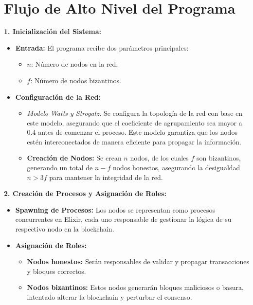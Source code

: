{\large{
    \section*{Flujo de Alto Nivel del Programa}

    \textbf{1. Inicialización del Sistema:}
    \begin{itemize}
        \item \textbf{Entrada:} El programa recibe dos parámetros principales:
        \begin{itemize}
            \item $n$: Número de nodos en la red.
            \item $f$: Número de nodos bizantinos.
        \end{itemize}
        \item \textbf{Configuración de la Red:}
        \begin{itemize}
            \item \textit{Modelo Watts y Strogatz:} Se configura la topología de la red con base en este modelo, asegurando que el coeficiente de agrupamiento sea mayor a 0.4 antes de comenzar el proceso. Este modelo garantiza que los nodos estén interconectados de manera eficiente para propagar la información.
            \item \textbf{Creación de Nodos:} Se crean $n$ nodos, de los cuales $f$ son bizantinos, generando un total de $n - f$ nodos honestos, asegurando la desigualdad $n > 3f$ para mantener la integridad de la red.
        \end{itemize}
    \end{itemize}

    \vspace{0.5cm}

    \textbf{2. Creación de Procesos y Asignación de Roles:}
    \begin{itemize}
        \item \textbf{Spawning de Procesos:} Los nodos se representan como procesos concurrentes en Elixir, cada uno responsable de gestionar la lógica de su respectivo nodo en la blockchain.
        \item \textbf{Asignación de Roles:}
        \begin{itemize}
            \item \textbf{Nodos honestos:} Serán responsables de validar y propagar transacciones y bloques correctos.
            \item \textbf{Nodos bizantinos:} Estos nodos generarán bloques maliciosos o basura, intentado alterar la blockchain y perturbar el consenso.
        \end{itemize}
    \end{itemize}

}}
